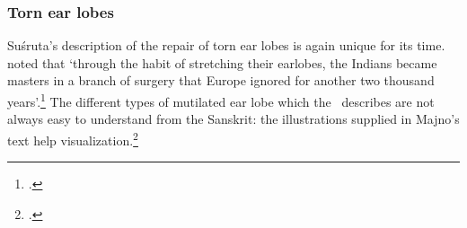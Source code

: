 
%



\subsubsection{Torn ear lobes}

Suśruta's description of the repair of torn ear lobes is again unique for
its time.  \citeauthor{majn-1975} noted that `through the habit of
stretching their earlobes, the Indians became masters in a branch of surgery
that Europe ignored for another two thousand years'.\footcite[291]{majn-1975}  
The different types of
mutilated ear lobe which the \SS\ describes are not always easy to understand
from the Sanskrit: the illustrations supplied in Majno's text help
visualization.\footcites[290--291]{majn-1975}[reproduced with permission 
in][92--93]{wuja-2003}

